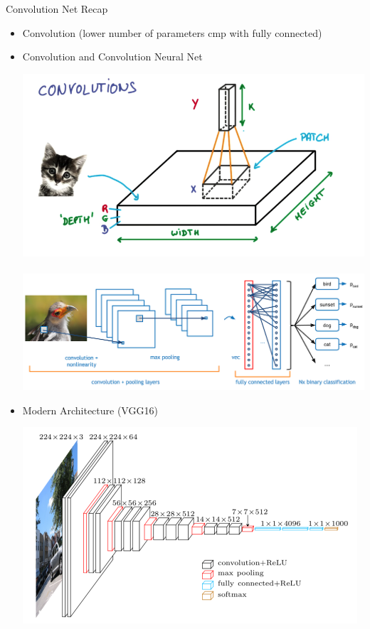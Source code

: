 \documentclass{beamer}
\begin{document}
\begin{frame}{Convolution Net Recap}
	\begin{itemize}
		\item   Convolution (lower number of parameters cmp with fully connected)  
		\item   Convolution and Convolution Neural Net
				\begin{center}
					  \includegraphics[scale=0.17]{img/cnn2}~~
					  \includegraphics[scale=0.35]{img/cnn5}
				\end{center}
		
		\item  Modern Architecture (VGG16)
				\begin{center}
					\includegraphics[scale=0.2]{img/cnn3}
				\end{center}
	\end{itemize}
\end{frame}
\end{document}
